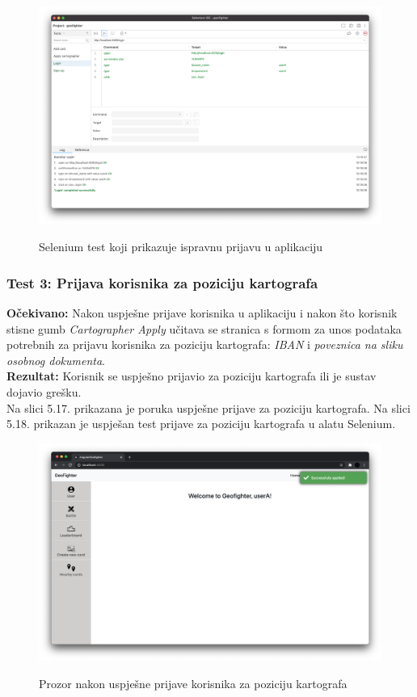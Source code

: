 			\begin{figure}[H]
				\centering
				\includegraphics[scale=0.27]{slike/SeleniumLoginTest.png} \\
				\caption{ Selenium test koji prikazuje ispravnu prijavu u aplikaciju}
				\label{fig:SeleniumRegistrationFail}
			\end{figure}

			\subsubsection{Test 3: Prijava korisnika za poziciju kartografa}
			\textbf{Očekivano: } Nakon uspješne prijave korisnika u aplikaciju i nakon što korisnik stisne gumb \textit{Cartographer Apply} učitava se stranica s formom za unos podataka potrebnih za prijavu korisnika za poziciju kartografa: \textit{IBAN} i \textit{poveznica na sliku osobnog dokumenta}.\\
			\textbf{Rezultat: } Korisnik  se uspješno prijavio za poziciju kartografa ili  je  sustav  dojavio grešku.\\

			    Na slici 5.17. prikazana je poruka uspješne prijave za poziciju kartografa. Na slici 5.18. prikazan je uspješan test prijave za poziciju kartografa u alatu Selenium.

			\begin{figure}[H]
				\centering
				\includegraphics[scale=0.27]{slike/SeleniumCartographerSuccess.png} \\
				\caption{ Prozor nakon uspješne prijave korisnika za poziciju kartografa}
				\label{fig:SeleniumCartographerSuccess}
			\end{figure}

